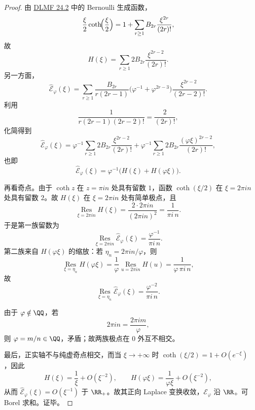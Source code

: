 \begin{proof}
由 \href{https://dlmf.nist.gov/24.2}{DLMF 24.2} 中的 Bernoulli 生成函数，
\[
\frac{\xi}{2}\coth\!\Bigl(\frac{\xi}{2}\Bigr)
=
1+\sum_{r\ge 1}B_{2r}\frac{\xi^{2r}}{(2r)!},
\]
故
\[
H(\xi)
=
\sum_{r\ge 1}2B_{2r}\frac{\xi^{2r-2}}{(2r)!}.
\]
另一方面，
\[
\widehat{\mathcal E}_\varphi(\xi)
=
\sum_{r\ge 1}
\frac{B_{2r}}{r(2r-1)}
\bigl(\varphi^{-1}+\varphi^{2r-3}\bigr)
\frac{\xi^{2r-2}}{(2r-2)!}.
\]
利用
\[
\frac{1}{r(2r-1)(2r-2)!}=\frac{2}{(2r)!},
\]
化简得到
\[
\widehat{\mathcal E}_\varphi(\xi)
=
\varphi^{-1}\sum_{r\ge 1}2B_{2r}\frac{\xi^{2r-2}}{(2r)!}
+
\varphi^{-1}\sum_{r\ge 1}2B_{2r}\frac{(\varphi\xi)^{2r-2}}{(2r)!},
\]
也即
\[
\widehat{\mathcal E}_\varphi(\xi)=\varphi^{-1}\bigl(H(\xi)+H(\varphi\xi)\bigr).
\]

再看奇点。由于 \(\coth z\) 在 \(z=\pi i n\) 处具有留数 \(1\)，函数 \(\coth(\xi/2)\) 在 \(\xi=2\pi i n\) 处具有留数 \(2\)。故 \(H(\xi)\) 在 \(\xi=2\pi i n\) 处有简单极点，且
\[
\operatorname*{Res}_{\xi=2\pi i n}H(\xi)
=
\frac{2\cdot 2\pi i n}{(2\pi i n)^2}
=
\frac{1}{\pi i\,n}.
\]
于是第一族留数为
\[
\operatorname*{Res}_{\xi=2\pi i n}\widehat{\mathcal E}_\varphi(\xi)
=
\frac{\varphi^{-1}}{\pi i\,n}.
\]
第二族来自 \(H(\varphi\xi)\) 的缩放：若 \(\eta_n=2\pi i n/\varphi\)，则
\[
\operatorname*{Res}_{\xi=\eta_n}H(\varphi\xi)
=
\frac{1}{\varphi}\operatorname*{Res}_{u=2\pi i n}H(u)
=
\frac{1}{\varphi\,\pi i\,n},
\]
故
\[
\operatorname*{Res}_{\xi=\eta_n}\widehat{\mathcal E}_\varphi(\xi)
=
\frac{\varphi^{-2}}{\pi i\,n}.
\]

由于 \(\varphi\notin\QQ\)，若
\[
2\pi i n=\frac{2\pi i m}{\varphi},
\]
则 \(\varphi=m/n\in\QQ\)，矛盾；故两族极点在 \(0\) 外互不相交。

最后，正实轴不与纯虚奇点相交，而当 \(\xi\to+\infty\) 时 \(\coth(\xi/2)=1+O(e^{-\xi})\)，因此
\[
H(\xi)=\frac{1}{\xi}+O(\xi^{-2}),
\qquad
H(\varphi\xi)=\frac{1}{\varphi\xi}+O(\xi^{-2}),
\]
从而 \(\widehat{\mathcal E}_\varphi(\xi)=O(\xi^{-1})\) 于 \(\RR_+\)。故其正向 Laplace 变换收敛，\(\mathcal E_\varphi\) 沿 \(\RR_+\) 可 Borel 求和。证毕。
\end{proof}

